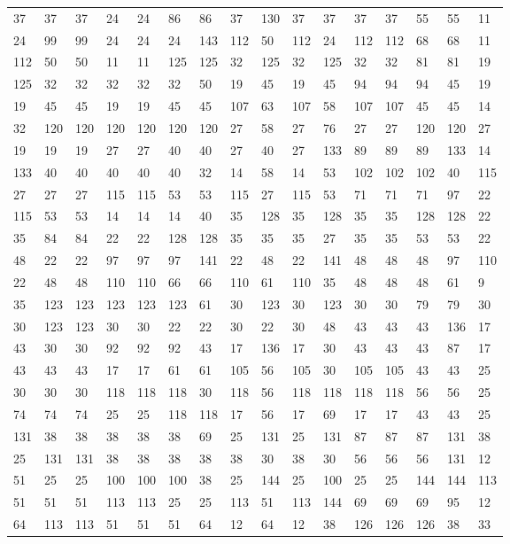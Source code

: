 \begin{longtable}{*{16}{l}}
37& 37& 37& 24& 24& 86& 86& 37& 130& 37& 37& 37& 37& 55& 55& 11\\
24& 99& 99& 24& 24& 24& 143& 112& 50& 112& 24& 112& 112& 68& 68& 11\\
112& 50& 50& 11& 11& 125& 125& 32& 125& 32& 125& 32& 32& 81& 81& 19\\
125& 32& 32& 32& 32& 32& 50& 19& 45& 19& 45& 94& 94& 94& 45& 19\\
19& 45& 45& 19& 19& 45& 45& 107& 63& 107& 58& 107& 107& 45& 45& 14\\
32& 120& 120& 120& 120& 120& 120& 27& 58& 27& 76& 27& 27& 120& 120& 27\\
19& 19& 19& 27& 27& 40& 40& 27& 40& 27& 133& 89& 89& 89& 133& 14\\
133& 40& 40& 40& 40& 40& 32& 14& 58& 14& 53& 102& 102& 102& 40& 115\\
27& 27& 27& 115& 115& 53& 53& 115& 27& 115& 53& 71& 71& 71& 97& 22\\
115& 53& 53& 14& 14& 14& 40& 35& 128& 35& 128& 35& 35& 128& 128& 22\\
35& 84& 84& 22& 22& 128& 128& 35& 35& 35& 27& 35& 35& 53& 53& 22\\
48& 22& 22& 97& 97& 97& 141& 22& 48& 22& 141& 48& 48& 48& 97& 110\\
22& 48& 48& 110& 110& 66& 66& 110& 61& 110& 35& 48& 48& 48& 61& 9\\
35& 123& 123& 123& 123& 123& 61& 30& 123& 30& 123& 30& 30& 79& 79& 30\\
30& 123& 123& 30& 30& 22& 22& 30& 22& 30& 48& 43& 43& 43& 136& 17\\
43& 30& 30& 92& 92& 92& 43& 17& 136& 17& 30& 43& 43& 43& 87& 17\\
43& 43& 43& 17& 17& 61& 61& 105& 56& 105& 30& 105& 105& 43& 43& 25\\
30& 30& 30& 118& 118& 118& 30& 118& 56& 118& 118& 118& 118& 56& 56& 25\\
74& 74& 74& 25& 25& 118& 118& 17& 56& 17& 69& 17& 17& 43& 43& 25\\
131& 38& 38& 38& 38& 38& 69& 25& 131& 25& 131& 87& 87& 87& 131& 38\\
25& 131& 131& 38& 38& 38& 38& 38& 30& 38& 30& 56& 56& 56& 131& 12\\
51& 25& 25& 100& 100& 100& 38& 25& 144& 25& 100& 25& 25& 144& 144& 113\\
51& 51& 51& 113& 113& 25& 25& 113& 51& 113& 144& 69& 69& 69& 95& 12\\
64& 113& 113& 51& 51& 51& 64& 12& 64& 12& 38& 126& 126& 126& 38& 33\\

\end{longtable}
